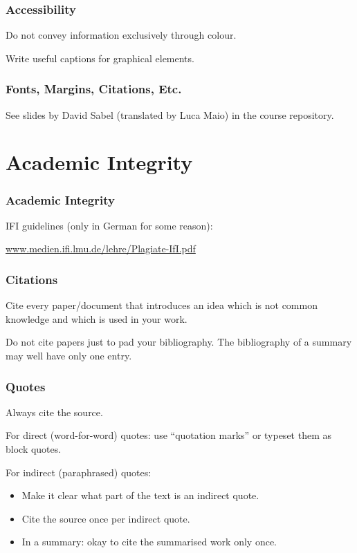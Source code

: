 \documentclass[xetex]{beamer}
\begin{document}
\begin{frame}
  \frametitle{Accessibility}

  Do not convey information exclusively through colour.

  \medskip

  Write useful captions for graphical elements.
\end{frame}

\begin{frame}
  \frametitle{Fonts, Margins, Citations, Etc.}

  See slides by David Sabel (translated by Luca Maio) in the course repository.
\end{frame}

\section{Academic Integrity}

\begin{frame}
  \frametitle{Academic Integrity}

  IFI guidelines (only in German for some reason):

  \medskip

  \url{www.medien.ifi.lmu.de/lehre/Plagiate-IfI.pdf}
\end{frame}

\begin{frame}
  \frametitle{Citations}

  Cite every paper/document that introduces an idea which is not common knowledge and which is used in your work.

  \medskip

  Do not cite papers just to pad your bibliography.
  The bibliography of a summary may well have only one entry.
\end{frame}

\begin{frame}
  \frametitle{Quotes}

  Always cite the source.

  \medskip

  For direct (word-for-word) quotes: use \enquote{quotation marks} or typeset them as block quotes.

  \medskip

  For indirect (paraphrased) quotes:
  \begin{itemize}
    \item Make it clear what part of the text is an indirect quote.
    \item Cite the source once per indirect quote.
    \item In a summary: okay to cite the summarised work only once.
  \end{itemize}
\end{frame}
\end{document}
